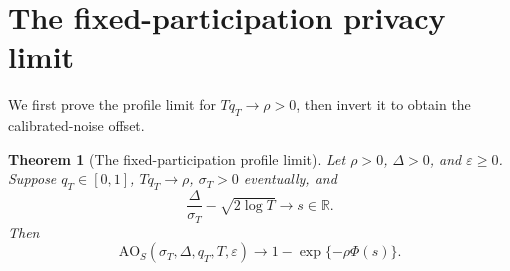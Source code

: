 \documentclass[11pt]{article}
\newtheorem{theorem}{Theorem}[section]
\theoremstyle{remark}
\newcommand{\R}{\mathbb R}
\newcommand{\AO}{\mathrm{AO}}
\begin{document}
\section{The fixed-participation privacy limit}\label{app:sparse-limit}
We first prove the profile limit for $Tq_T\to\rho>0$, then invert it to
obtain the calibrated-noise offset.

\begin{theorem}[The fixed-participation profile limit]\label{thm:accountant-limit}
Let $\rho>0$, $\Delta>0$, and $\varepsilon\geq0$. Suppose
$q_T\in[0,1]$, $Tq_T\to\rho$, $\sigma_T>0$ eventually, and
\[
 \frac{\Delta}{\sigma_T}-\sqrt{2\log T}\longrightarrow s\in\R.
\]
Then
\[
 \AO_S(\sigma_T,\Delta,q_T,T,\varepsilon)
 \longrightarrow1-\exp\{-\rho\Phi(s)\}.
\]
\end{theorem}
\end{document}
